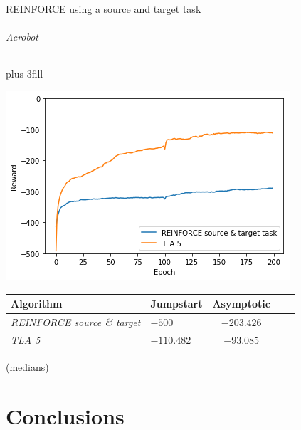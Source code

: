 \begin{frame}[fragile]{REINFORCE using a source and target task}
\framesubtitle{Acrobot}
\vskip0pt plus 3fill
\begin{center}
    \includegraphics[width=.7\linewidth]{results/Acrobot/reinforce_2tasks.png}
\end{center}
\begin{tabular}{llccc}
\hline
Algorithm & Jumpstart & Asymptotic \\
\hline
   \textit{REINFORCE source \& target} & $-500$ & $-203.426$ \\
   \textit{TLA 5} & $\bm{-110.482}$ & $\bm{-93.085}$ \\
\hline
\end{tabular}
(medians)
\end{frame}

\part{Conclusions}
